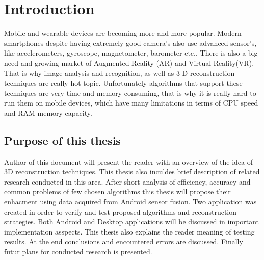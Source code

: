 
\chapter{Introduction}
\ifpdf
    \graphicspath{{1_introduction/figures/PNG/}{1_introduction/figures/PDF/}{1_introduction/figures/}}
\else
    \graphicspath{{1_introduction/figures/EPS/}{1_introduction/figures/}}
\fi


Mobile and wearable devices are becoming more and more popular. Modern smartphones despite having extremely good camera's also use advanced sensor's, like accelerometers, gyroscope, magnetometer, barometer etc.. There is also a big need and growing market of Augmented Reality (AR) and Virtual Reality(VR). That is why image analysis and recognition, as well as 3-D reconstruction techniques are really hot topic. Unfortunately algorithms that support these techniques are very time and memory consuming, that is why it is really hard to run them on mobile devices, which have many limitations in terms of CPU speed and RAM memory capacity.

\section{Purpose of this thesis} %
Author of this document will present the reader with an overview of the idea of 3D reconstruction techniques. This thesis also inculdes brief description of related research conducted in this area. After short analysis of efficiency, accuracy and common problems of few chosen algorithms this thesis will propose their enhacment using data acquired from Android sensor fusion. Two application was created in order to verify and test proposed algorithms and reconstruction strategies. Both Android and Desktop applications will be discussed in important implementation asspects. This thesis also explains the reader meaning of testing results. At the end conclusions and encountered errors are discussed. Finally futur plans for conducted research is presented.
